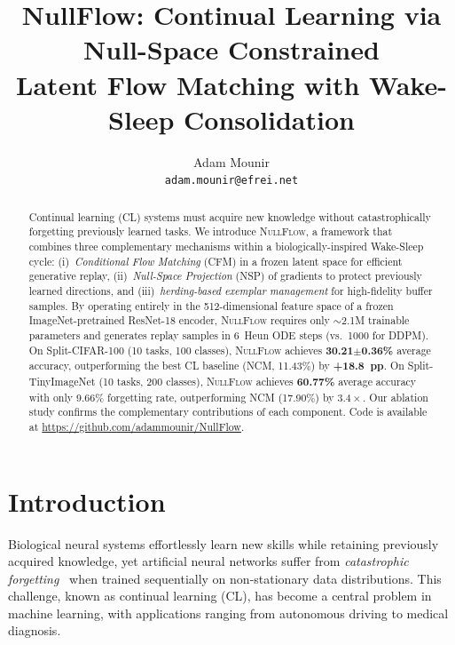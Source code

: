 \documentclass[10pt,twocolumn,letterpaper]{article}
\title{NullFlow: Continual Learning via Null-Space Constrained\\Latent Flow Matching with Wake-Sleep Consolidation}
\author{
  Adam Mounir\\
  \texttt{adam.mounir@efrei.net}
}
\date{}
\newcommand{\ours}{\textsc{NullFlow}}
\begin{document}
\maketitle

\begin{abstract}
Continual learning (CL) systems must acquire new knowledge without catastrophically forgetting previously learned tasks. We introduce \ours{}, a framework that combines three complementary mechanisms within a biologically-inspired Wake-Sleep cycle: (i)~\textit{Conditional Flow Matching} (CFM) in a frozen latent space for efficient generative replay, (ii)~\textit{Null-Space Projection} (NSP) of gradients to protect previously learned directions, and (iii)~\textit{herding-based exemplar management} for high-fidelity buffer samples. By operating entirely in the 512-dimensional feature space of a frozen ImageNet-pretrained ResNet-18 encoder, \ours{} requires only $\sim$2.1M trainable parameters and generates replay samples in 6~Heun ODE steps (vs.\ 1000 for DDPM). On Split-CIFAR-100 (10 tasks, 100 classes), \ours{} achieves \textbf{30.21$\pm$0.36\%} average accuracy, outperforming the best CL baseline (NCM, 11.43\%) by \textbf{+18.8~pp}. On Split-TinyImageNet (10 tasks, 200 classes), \ours{} achieves \textbf{60.77\%} average accuracy with only 9.66\% forgetting rate, outperforming NCM (17.90\%) by $3.4\times$. Our ablation study confirms the complementary contributions of each component. Code is available at \url{https://github.com/adammounir/NullFlow}.
\end{abstract}

\section{Introduction}
\label{sec:intro}

Biological neural systems effortlessly learn new skills while retaining previously acquired knowledge, yet artificial neural networks suffer from \textit{catastrophic forgetting}~\cite{mccloskey1989catastrophic,french1999catastrophic} when trained sequentially on non-stationary data distributions. This challenge, known as continual learning (CL), has become a central problem in machine learning, with applications ranging from autonomous driving to medical diagnosis.
\end{document}
